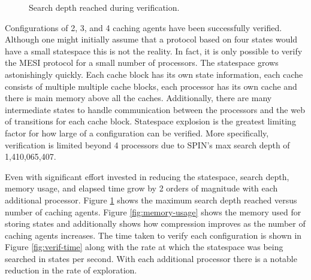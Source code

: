 \documentclass[12pt]{article}
\begin{document}
\begin{figure}[b!]
    \centering

    \caption{Search depth reached during verification.}
    \label{fig:search-depth}
\end{figure}

Configurations of 2, 3, and 4 caching agents have been successfully verified. Although one might initially assume that a protocol based on four states would have a small statespace this is not the reality. In fact, it is only possible to verify the MESI protocol for a small number of processors. The statespace grows astonishingly quickly. Each cache block has its own state information, each cache consists of multiple multiple cache blocks, each processor has its own cache and there is main memory above all the caches. Additionally, there are many intermediate states to handle communication between the processors and the web of transitions for each cache block. Statespace explosion is the greatest limiting factor for how large of a configuration can be verified. More specifically, verification is limited beyond 4 processors due to SPIN's max search depth of 1,410,065,407.

Even with significant effort invested in reducing the statespace, search depth, memory usage, and elapsed time grow by 2 orders of magnitude with each additional processor. Figure \ref{fig:search-depth} shows the maximum search depth reached versus number of caching agents. Figure \ref{fig:memory-usage} shows the memory used for storing states and additionally shows how compression improves as the number of caching agents increases. The time taken to verify each configuration is shown in Figure \ref{fig:verif-time} along with the rate at which the statespace was being searched in states per second. With each additional processor there is a notable reduction in the rate of exploration.
\end{document}
